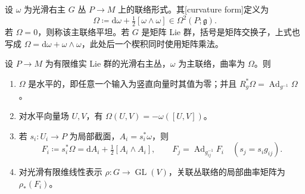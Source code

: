 \begin{definition}\label{g1:def:principal-curvature}
	设 \(\omega\) 为光滑右主 \(G\) 丛 \(P\to M\) 上的联络形式。其[curvature form]定义为
	\begin{equation}\label{g1:eq:principal-curvature-structure}
		\Omega\coloneqq\mathrm{d}\omega+\tfrac12[\omega\wedge\omega]\in\Omega^2(P;\mathfrak g).
	\end{equation}
	若 \(\Omega=0\)，则称该主联络平坦。若 \(G\) 是矩阵 Lie 群，括号是矩阵交换子，上式也写成 \(\Omega=\mathrm{d}\omega+\omega\wedge\omega\)，此处后一个楔积同时使用矩阵乘法。
\end{definition}

\begin{proposition}\label{g1:prop:principal-curvature-properties}
	设 \(P\to M\) 为有限维实 Lie 群的光滑右主丛，\(\omega\) 为主联络，曲率为 \(\Omega\)。则
	\begin{enumerate}
		\item \(\Omega\) 是水平的，即任意一个输入为竖直向量时其值为零；并且 \(R_g^*\Omega=\operatorname{Ad}_{g^{-1}}\Omega\)。
		\item 对水平向量场 \(U,V\)，有 \(\Omega(U,V)=-\omega([U,V])\)。
		\item 若 \(s_i:U_i\to P\) 为局部截面，\(A_i=s_i^*\omega\)，则
		\begin{equation}\label{g1:eq:principal-local-curvature}
			F_i\coloneqq s_i^*\Omega=\mathrm{d}A_i+\tfrac12[A_i\wedge A_i],\qquad
			F_j=\operatorname{Ad}_{g_{ij}^{-1}}F_i\quad(s_j=s_i g_{ij}).
		\end{equation}
		\item 对光滑有限维线性表示 \(\rho:G\to\operatorname{GL}(V)\)，关联丛联络的局部曲率矩阵为 \(\rho_*(F_i)\)。
	\end{enumerate}
\end{proposition}
